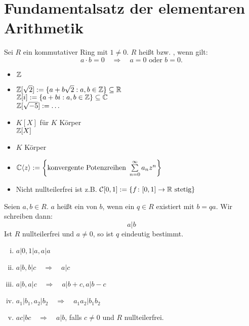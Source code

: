 \section{Fundamentalsatz der elementaren Arithmetik}
\label{sec:para1}

	Sei $R$ ein kommutativer Ring mit $1 \neq 0$. $R$ heißt  bzw. , wenn gilt:  
	\[ a \cdot b = 0 \quad \Rightarrow \quad a = 0 \text{ oder } b = 0.\]

\begin{bsp} \label{bsp_integritaetsringe}
	\begin{itemize}
		\item $\ZZ$
		\item $\ZZ[\sqrt{2}] := \{a + b\sqrt{2} : a,b \in \ZZ \} \subseteq \RR$ \\
			$\ZZ[i] := \{a + bi : a,b \in \ZZ\} \subseteq \CC$ \\
			$\ZZ[\sqrt{-5}] := \dots$
		\item $K[X]$ für $K$ Körper \\
			$\ZZ[X]$
		\item $K$ Körper
		\item $\CC \sprod{z} := \penbrace*{\text{konvergente Potenzreihen } \sum\limits_{n=0}^{\infty} a_n z^n}$
		\item Nicht nullteilerfrei ist z.B. $\mathcal{C}[0,1] := \{f \colon [0,1] \rightarrow \RR \text{ stetig} \}$
	\end{itemize}
\end{bsp}

\begin{defn}[Teilbarkeit] \label{def_1.1}
	Seien $a,b \in R$. $a$ heißt ein  von $b$, wenn ein $q \in R$ existiert mit $b = qa$. Wir schreiben dann:
	\[ a | b \]
	Ist $R$ nullteilerfrei und $a \neq 0$, so ist $q$ eindeutig bestimmt.
\end{defn}

\begin{falko} \label{F1.1}
	\begin{enumerate}[(i)]
		\item $a | 0, 1 | a, a | a$
		\item $a | b, b | c \quad \Rightarrow \quad a | c$
		\item $a | b, a | c \quad \Rightarrow \quad a | b+c, a | b-c$
		\item $a_1 | b_1, a_2 | b_2 \quad \Rightarrow \quad a_1 a_2 | b_1 b_2$
		\item $ac | bc \quad \Rightarrow \quad a | b$, falls $c \neq 0$ und $R$ nullteilerfrei.
	\end{enumerate}	
\end{falko}

